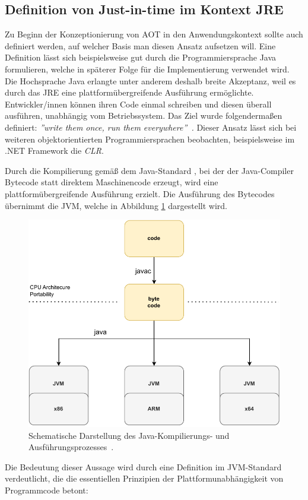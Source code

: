  \subsection{Definition von Just-in-time im Kontext JRE}
 Zu Beginn der Konzeptionierung von \ac{AOT} in den Anwendungskontext sollte auch definiert werden, auf welcher Basis man diesen Ansatz aufsetzen will. Eine Definition lässt sich beispielsweise gut durch die Programmiersprache Java formulieren, welche in späterer Folge für die Implementierung verwendet wird. Die Hochsprache Java erlangte unter anderem deshalb breite Akzeptanz, weil es durch das \ac{JRE} eine plattformübergreifende Ausführung ermöglichte. Entwickler/innen können ihren Code einmal schreiben und diesen überall ausführen, unabhängig vom Betriebssystem. Das Ziel wurde folgendermaßen definiert: \textit{''write them once, run them everywhere''~\parencite[vgl.][]{Gosling2023Java}.} Dieser Ansatz lässt sich bei weiteren objektorientierten Programmiersprachen beobachten, beispielsweise im .NET Framework die \textit{\ac{CLR}}.  

Durch die Kompilierung gemäß dem Java-Standard \parencite[vgl.][]{Lindholm2023JavaVM}, bei der der Java-Compiler Bytecode statt direktem Maschinencode erzeugt, wird eine plattformübergreifende Ausführung erzielt. Die Ausführung des Bytecodes übernimmt die \ac{JVM}, welche in Abbildung \ref{fig:JVMAOT} dargestellt wird.
 
 \begin{figure}[H]
    \centering
    \includegraphics[width=12cm]{images/40_concept/JVM.pdf}
    \caption[Schematische Darstellung des Java-Kompilierungs- und Ausführungsprozesses]{Schematische Darstellung des Java-Kompilierungs- und Ausführungsprozesses~\parencite[vgl.][]{Lindholm2023JavaVM}.}
    \label{fig:JVMAOT}
\end{figure}
Die Bedeutung dieser Aussage wird durch eine Definition im JVM-Standard ~\parencite[vgl.][]{Lindholm2023JavaVM} verdeutlicht, die die essentiellen Prinzipien der Plattformunabhängigkeit von Programmcode betont:
 
